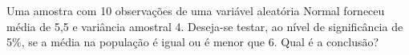 %
%


\begin{exercicioBanco}[\valorquestao]
    Uma amostra com 10 observações de uma variável aleatória Normal forneceu média de 5{,}5 e variância amostral 4. Deseja-se testar, ao nível de significância de 5\%, se a média na população é igual ou é menor que 6. Qual é a conclusão?
\end{exercicioBanco}

